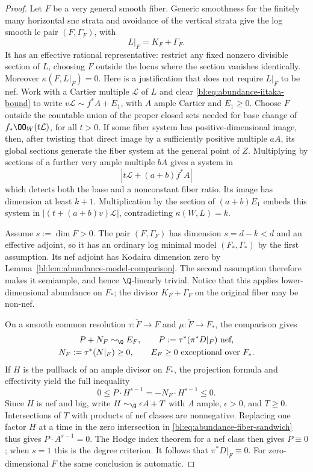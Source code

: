 \begin{proof}
Let $F$ be a very general smooth fiber.  Generic smoothness for
the finitely many horizontal snc strata and avoidance of the
vertical strata give the log smooth lc pair $(F,\Gamma_F)$, with
\[
 L|_F=K_F+\Gamma_F.
\]
It has an effective rational representative: restrict any fixed
nonzero divisible section of $L$, choosing $F$ outside the locus
where the section vanishes identically.  Moreover
$\kappa(F,L|_F)=0$.  Here is a justification that does not require
$L|_F$ to be nef.  Work with a Cartier multiple $\mathcal L$ of
$L$ and clear \eqref{bl:eq:abundance-iitaka-bound} to write
$v\mathcal L\sim f^*A+E_1$, with $A$ ample Cartier and $E_1\geq0$.
Choose $F$ outside the countable union of the proper closed
sets needed for base change of $f_*\OO_W(t\mathcal L)$, for
all $t>0$.  If some fiber system has positive-dimensional image,
then, after twisting that direct image by a sufficiently positive
multiple $aA$, its global sections generate the fiber system at
the general point of $Z$.  Multiplying by sections of a further
very ample multiple $bA$ gives a system in
\[
 |t\mathcal L+(a+b)f^*A|
\]
which detects both the base and a nonconstant fiber ratio.  Its
image has dimension at least $k+1$.  Multiplication by the section
of $(a+b)E_1$ embeds this system in
$|(t+(a+b)v)\mathcal L|$, contradicting $\kappa(W,L)=k$.

Assume $s:=\dim F>0$.  The pair $(F,\Gamma_F)$ has dimension
$s=d-k<d$ and an effective adjoint, so it has an ordinary log
minimal model $(F_*,\Gamma_*)$ by the first assumption.
Its nef adjoint has Kodaira dimension zero by
Lemma~\ref{bl:lem:abundance-model-comparison}.  The second assumption
therefore makes it semiample, and hence $\Q$-linearly trivial.
Notice that this applies lower-dimensional abundance on $F_*$;
the divisor $K_F+\Gamma_F$ on the original fiber may be non-nef.

On a smooth common resolution $\tau:\widetilde F\to F$ and
$\mu:\widetilde F\to F_*$, the comparison gives
\begin{equation}
 \begin{gathered}
 P+N_F\sim_{\Q}E_F,\qquad P:=\tau^*(\pi^*D|_F)\text{ nef},\\
 N_F:=\tau^*(N|_F)\geq0,\qquad
 E_F\geq0\text{ exceptional over }F_*.
 \end{gathered}
 \label{bl:eq:abundance-fiber-comparison}
\end{equation}
If $H$ is the pullback of an ample divisor on $F_*$, the
projection formula and effectivity yield the full inequality
\begin{equation}
 0\leq P\cdot H^{s-1}
       =-N_F\cdot H^{s-1}\leq0.
 \label{bl:eq:abundance-fiber-sandwich}
\end{equation}
Since $H$ is nef and big, write $H\sim_{\Q}\epsilon A+T$ with
$A$ ample, $\epsilon>0$, and $T\geq0$.  Intersections of $T$
with products of nef classes are nonnegative.  Replacing one
factor $H$ at a time in the zero intersection in
\eqref{bl:eq:abundance-fiber-sandwich} thus gives
$P\cdot A^{s-1}=0$.  The Hodge index theorem for a nef class
then gives $P\equiv0$; when $s=1$ this is the degree criterion.
It follows that $\pi^*D|_F\equiv0$.  For zero-dimensional $F$
the same conclusion is automatic.


\end{proof}
